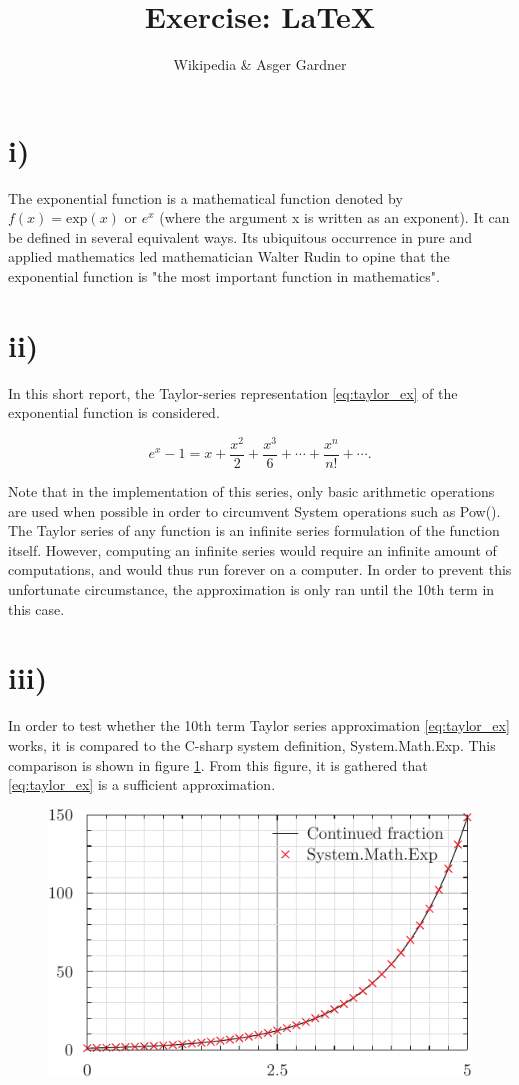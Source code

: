 \documentclass[12pt]{article}
\begin{document}
\title{Exercise: \LaTeX}
\author{Wikipedia \& Asger Gardner}

\maketitle

\section*{i)}

The exponential function is a mathematical function denoted by $f(x)=\text{exp}(x)$ or $e^{x}$ (where the argument x is written as an exponent). It can be defined in several equivalent ways. Its ubiquitous occurrence in pure and applied mathematics led mathematician Walter Rudin to opine that the exponential function is "the most important function in mathematics". 

\section*{ii)}

In this short report, the Taylor-series representation \eqref{eq:taylor_ex} of the exponential function is considered.  

\begin{equation} \label{eq:taylor_ex}
	e^x-1=x+\frac {x^2}2 + \frac{x^3}6+\cdots +\frac{x^n}{n!}+\cdots.	
\end{equation}

Note that in the implementation of this series, only basic arithmetic operations are used when possible in order to circumvent System operations such as Pow(). The Taylor series of any function is an infinite series formulation of the function itself. However, computing an infinite series would require an infinite amount of computations, and would thus run forever on a computer. In order to prevent this unfortunate circumstance, the approximation is only ran until the 10th term in this case.

\section*{iii)}

In order to test whether the 10th term Taylor series approximation \eqref{eq:taylor_ex} works, it is compared to the C-sharp system definition, System.Math.Exp. This comparison is shown in figure \ref{fig:ex}. From this figure, it is gathered that \eqref{eq:taylor_ex} is a sufficient approximation. 

\begin{figure}[H] \label{fig:ex}
	\includegraphics[width=\linewidth]{explot.pdf}
\end{figure}
\end{document}
